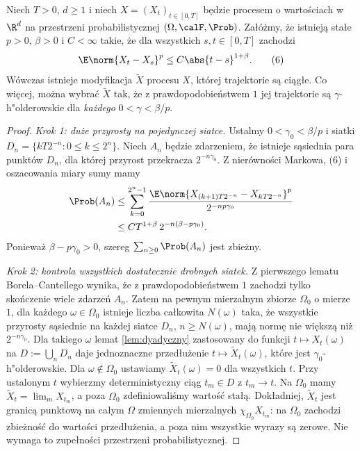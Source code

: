 \begin{twierdzenie}
\label{thm:kol-cont}
Niech $T>0$, $d\ge1$ i niech
$X=(X_t)_{t\in[0,T]}$ będzie procesem o wartościach w $\R^d$
na przestrzeni probabilistycznej $(\Omega,\calF,\Prob)$.
Załóżmy, że istnieją stałe $p>0$, $\beta>0$ i $C<\infty$
takie, że dla wszystkich $s,t\in[0,T]$ zachodzi
\[
\E\norm{X_t-X_s}^{p}\le C\abs{t-s}^{1+\beta}.
\tag{6}
\]
Wówczas istnieje modyfikacja $\widetilde X$ procesu $X$,
której trajektorie są ciągłe. Co więcej, można wybrać
$\widetilde X$ tak, że z prawdopodobieństwem $1$ jej
trajektorie są $\gamma$-h"olderowskie dla
\emph{każdego} $0<\gamma<\beta/p$.
\end{twierdzenie}
\begin{proof}
\emph{Krok 1: duże przyrosty na pojedynczej siatce.}
Ustalmy $0<\gamma_0<\beta/p$ i siatki
$D_n=\{kT2^{-n}:0\le k\le2^n\}$.
Niech $A_n$ będzie zdarzeniem, że istnieje sąsiednia
para punktów $D_n$, dla której przyrost przekracza
$2^{-n\gamma_0}$. Z nierówności Markowa, (6) i oszacowania
miary sumy mamy
\[
\begin{aligned}
\Prob(A_n)
&\le\sum_{k=0}^{2^n-1}
\frac{\E\norm{X_{(k+1)T2^{-n}}-X_{kT2^{-n}}}^{p}}
{2^{-np\gamma_0}}\\
&\le C T^{1+\beta}\,2^{-n(\beta-p\gamma_0)}.
\end{aligned}
\]
Ponieważ $\beta-p\gamma_0>0$, szereg
$\sum_{n\ge0}\Prob(A_n)$ jest zbieżny.

\emph{Krok 2: kontrola wszystkich dostatecznie drobnych siatek.}
Z pierwszego lematu Borela--Cantellego wynika, że z
prawdopodobieństwem $1$ zachodzi tylko skończenie wiele
zdarzeń $A_n$. Zatem na pewnym mierzalnym zbiorze
$\Omega_0$ o mierze $1$, dla każdego $\omega\in\Omega_0$
istnieje liczba całkowita $N(\omega)$ taka, że
wszystkie przyrosty sąsiednie na każdej siatce
$D_n$, $n\ge N(\omega)$, mają normę nie większą niż
$2^{-n\gamma_0}$. Dla takiego $\omega$ lemat
\ref{lem:dyadyczny} zastosowany do funkcji
$t\mapsto X_t(\omega)$ na $D:=\bigcup_nD_n$
daje jednoznaczne przedłużenie
$t\mapsto\widetilde X_t(\omega)$, które jest
$\gamma_0$-h"olderowskie.
Dla $\omega\notin\Omega_0$ ustawiamy
$\widetilde X_t(\omega)=0$ dla wszystkich $t$.
Przy ustalonym $t$ wybierzmy deterministyczny ciąg
$t_m\in D$ z $t_m\to t$. Na $\Omega_0$ mamy
$\widetilde X_t=\lim_m X_{t_m}$, a poza $\Omega_0$
zdefiniowaliśmy wartość stałą. Dokładniej, $\widetilde X_t$ jest granicą punktową na
całym $\Omega$ zmiennych mierzalnych
$\chi_{\Omega_0}X_{t_m}$: na $\Omega_0$ zachodzi zbieżność
do wartości przedłużenia, a poza nim wszystkie wyrazy
są zerowe. Nie wymaga to zupełności przestrzeni probabilistycznej.


\end{proof}
